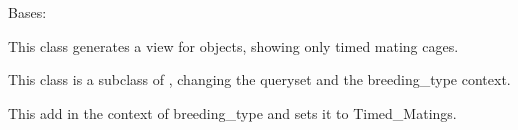 \documentclass[letterpaper,10pt,english]{sphinxmanual}
\begin{document}
\begin{fulllineitems}
\label{api:mousedb.animal.views.BreedingListTimedMating}
Bases: {\hyperref[api:mousedb.animal.views.BreedingList]{}}

This class generates a view for {\hyperref[api:mousedb.animal.models.Breeding]{}} objects, showing only timed mating cages.

This class is a subclass of {\hyperref[api:mousedb.animal.views.BreedingList]{}}, changing the queryset and the  breeding\_type context.

\begin{fulllineitems}
\label{api:mousedb.animal.views.BreedingListTimedMating.get_context_data}
This add in the context of breeding\_type and sets it to Timed\_Matings.

\end{fulllineitems}


\begin{fulllineitems}
\label{api:mousedb.animal.views.BreedingListTimedMating.queryset}
\end{fulllineitems}


\end{fulllineitems}

\end{document}
